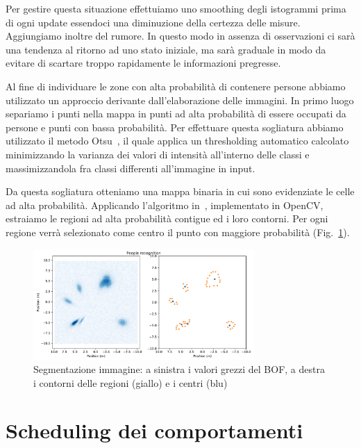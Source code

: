 \documentclass[a4paper]{article}
\begin{document}
	Per gestire questa situazione effettuiamo uno smoothing degli istogrammi
	prima di ogni update essendoci una diminuzione della certezza delle misure.
	Aggiungiamo inoltre del rumore. In questo modo in assenza di osservazioni
	ci sarà una tendenza al ritorno ad uno stato iniziale, ma sarà graduale in
	modo da evitare di scartare troppo rapidamente le informazioni pregresse.

	Al fine di individuare le zone con alta probabilità di contenere persone
	abbiamo utilizzato un approccio derivante dall'elaborazione delle immagini.
	In primo luogo separiamo i punti nella mappa in punti ad alta probabilità
	di essere occupati da persone e punti con bassa probabilità. Per effettuare
	questa sogliatura abbiamo utilizzato il metodo Otsu~\cite{otsu}, il quale
	applica un thresholding automatico calcolato minimizzando la varianza dei
	valori di intensità all'interno delle classi e massimizzandola fra classi
	differenti all'immagine in input.  
	
	Da questa sogliatura otteniamo una mappa binaria in cui sono evidenziate le
	celle ad alta probabilità. Applicando l'algoritmo in~\cite{contours},
	implementato in OpenCV, estraiamo le regioni ad alta probabilità contigue
	ed i loro contorni. Per ogni regione verrà selezionato come centro il punto
	con maggiore probabilità (Fig.~\ref{fig:image_segmentation}).

	\begin{figure}[H]
		\centering
		\includegraphics[width=0.75\textwidth]{./img/image_segmentation.pdf}
		\caption{Segmentazione immagine: a sinistra i valori grezzi del BOF, a destra i contorni delle regioni (giallo) e i centri (blu) }
		\label{fig:image_segmentation}
	\end{figure}

	\section{Scheduling dei comportamenti}\label{sec:Scheduling-dei-comportamenti}
	
\end{document}
